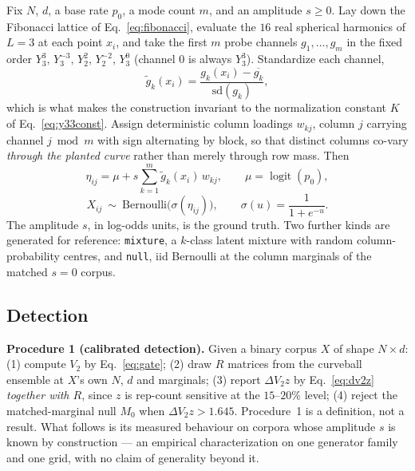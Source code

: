 \documentclass[11pt,a4paper]{article}
\theoremstyle{plain}
\theoremstyle{remark}
\theoremstyle{plain}
\begin{document}
Fix $N$, $d$, a base rate $p_0$, a mode count $m$, and an amplitude $s\ge0$. Lay down the Fibonacci lattice of Eq.~\eqref{eq:fibonacci}, evaluate the $16$ real spherical harmonics of $L=3$ at each point $x_i$, and take the first $m$ probe channels $g_1,\dots,g_m$ in the fixed order $Y_3^3,\,Y_3^{-3},\,Y_2^{2},\,Y_2^{-2},\,Y_3^{0}$ (channel $0$ is always $Y_3^3$). Standardize each channel,
\begin{equation}
\tilde g_k(x_i)=\frac{g_k(x_i)-\overline{g_k}}{\mathrm{sd}(g_k)},
\label{eq:standardize}
\end{equation}
which is what makes the construction invariant to the normalization constant $K$ of Eq.~\eqref{eq:y33const}. Assign deterministic column loadings $w_{kj}$, column $j$ carrying channel $j\bmod m$ with sign alternating by block, so that distinct columns co-vary \emph{through the planted curve} rather than merely through row mass. Then
\begin{equation}
\eta_{ij}=\mu+s\sum_{k=1}^{m}\tilde g_k(x_i)\,w_{kj},\qquad \mu=\operatorname{logit}(p_0),
\label{eq:logits}
\end{equation}
\begin{equation}
X_{ij}\ \sim\ \mathrm{Bernoulli}\big(\sigma(\eta_{ij})\big),\qquad \sigma(u)=\frac{1}{1+e^{-u}} .
\label{eq:bernoulli}
\end{equation}
The amplitude $s$, in log-odds units, is the ground truth. Two further kinds are generated for reference: \texttt{mixture}, a $k$-class latent mixture with random column-probability centres, and \texttt{null}, iid Bernoulli at the column marginals of the matched $s{=}0$ corpus.

\subsection{Detection}

\textbf{Procedure 1 (calibrated detection).}
\label{thm:detection}
Given a binary corpus $X$ of shape $N\times d$: (1) compute $V_2$ by Eq.~\eqref{eq:gate}; (2) draw $R$ matrices from the curveball ensemble at $X$'s own $N$, $d$ and marginals; (3) report $\Delta V_2z$ by Eq.~\eqref{eq:dv2z} \emph{together with $R$}, since $z$ is rep-count sensitive at the $15$--$20\%$ level; (4) reject the matched-marginal null $M_0$ when $\Delta V_2z>1.645$. Procedure~1 is a definition, not a result. What follows is its measured behaviour on corpora whose amplitude $s$ is known by construction --- an empirical characterization on one generator family and one grid, with no claim of generality beyond it.
\end{document}
